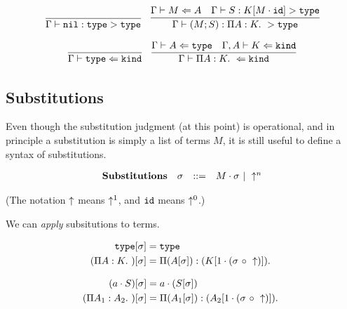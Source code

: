 \documentclass[11pt,twoside]{article}
\begin{document}
\bigskip 
{}
\bigskip 

$$
\begin{array}{lr}
\infer{\Focus{\Nil}{\Type}{\Type}}{} & 
\infer{\Focus{(M;S)}{\PiTyp{A}{K}}{\Type}}{\CheckTy{M}{A} & \Focus{S}{K[M\cdot\IdSub]}{\Type}}
\end{array} 
$$

\bigskip 
{}
\bigskip 

$$
\begin{array}{cc}
\infer{\CheckTy{\Type}{\Kind}}{} &
\infer{\CheckTy{\PiTyp{A}{K}}{\Kind}}{\CheckTy{A}{\Type} & \CheckTy[\Gamma,A]{K}{\Kind}}
\end{array} 
$$

\subsection{Substitutions}

Even though the substitution judgment (at this point) is operational,
and in principle a substitution is simply a list of terms $M$,
it is still useful to define a syntax of substitutions.  

\newcommand{\Msub}{[\sigma]}
\newcommand{\Ssub}{[1\cdot(\sigma\Comp\Shift)]}

$$
\begin{array}{llll}
\mathbf{Substitutions} & \sigma & ::= & M\cdot\sigma \ |\  \uparrow^n \\
\end{array} 
$$

(The notation $\uparrow$ means $\uparrow^1$, and $\mathtt{id}$ means $\uparrow^0$.)  

We can \emph{apply} subsitutions to terms.

\bigskip
\framebox{$K\Msub = K'$}

\begin{align*} 
\Type\Msub &= \Type \\
(\PiTyp{A}{K})\Msub &= \PiTyp{(A\Msub)}{(K\Ssub)}\\
\end{align*} 

\framebox{$A\Msub = A'$}

\begin{align*} 
(a\cdot S)\Msub &= a\cdot (S\Msub) \\
(\PiTyp{A_1}{A_2})\Msub &= \PiTyp{(A_1\Msub)}{(A_2\Ssub)} \\
\end{align*} 

\framebox{$M\Msub = M'$}
\end{document}
